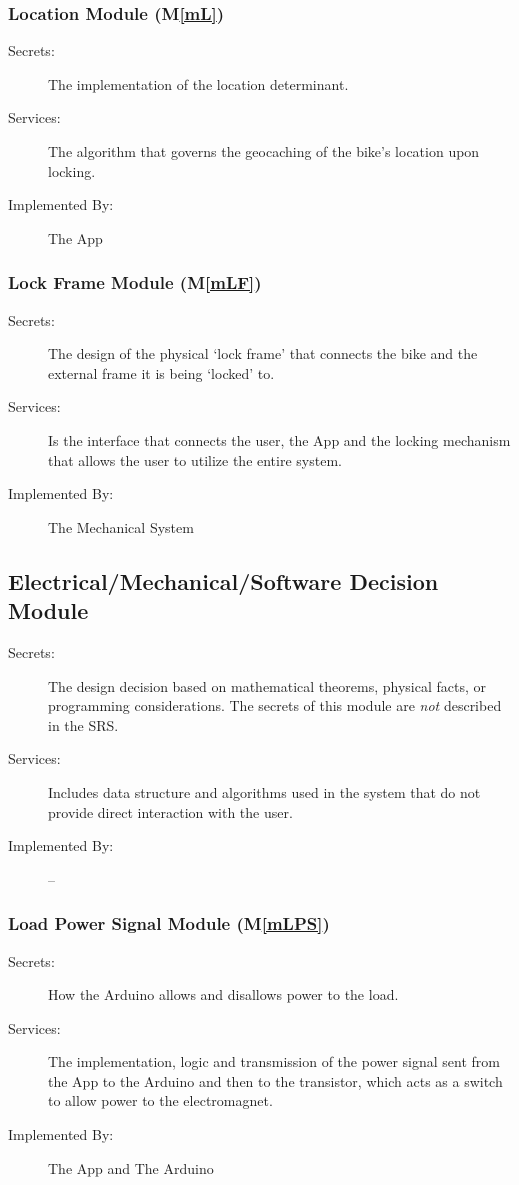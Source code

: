 \documentclass[12pt, titlepage]{article}
\newcommand{\mref}[1]{M\ref{#1}}
\begin{document}
\subsubsection{Location Module (\mref{mL})}
\begin{description}
\item[Secrets:]The implementation of the location determinant.
\item[Services:]The algorithm that governs the geocaching of the bike’s location upon locking.
\item[Implemented By:]The App
\end{description}

\subsubsection{Lock Frame Module (\mref{mLF})}
\begin{description}
\item[Secrets:]The design of the physical ‘lock frame’ that connects the bike and the external frame it is being ‘locked’ to.
\item[Services:]Is the interface that connects the user, the App and the locking mechanism that allows the user to utilize the entire system.
\item[Implemented By:]The Mechanical System
\end{description}

\subsection{Electrical/Mechanical/Software Decision Module}

\begin{description}
\item[Secrets:] The design decision based on mathematical theorems, physical
  facts, or programming considerations. The secrets of this module are
  \emph{not} described in the SRS.
\item[Services:] Includes data structure and algorithms used in the system that
  do not provide direct interaction with the user. 
\item[Implemented By:] --
\end{description}

\subsubsection{Load Power Signal Module (\mref{mLPS})}
\begin{description}
\item[Secrets:]How the Arduino allows and disallows power to the load.
\item[Services:]The implementation, logic and transmission of the power signal sent from the App to the Arduino and then to the transistor, which acts as a switch to allow power to the electromagnet.
\item[Implemented By:]The App and The Arduino
\end{description}
\end{document}
